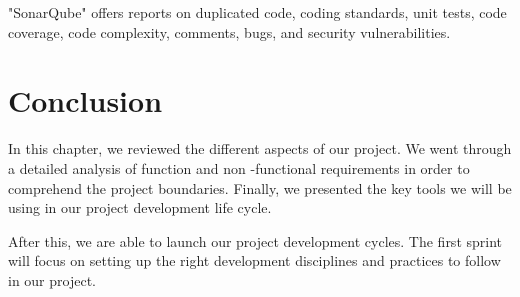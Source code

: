 \begin{spacing}{1.2}
"SonarQube" offers reports on duplicated code, coding standards, unit tests, code coverage, code complexity, comments, bugs, and security vulnerabilities.
\section*{Conclusion}
In this chapter, we reviewed the different aspects of our project. We went through a detailed analysis of function and non -functional requirements in order to comprehend the project boundaries.
Finally, we presented the key tools we will be using in our project development life cycle.

After this, we are able to launch our project development cycles. The first sprint will focus on setting up the right development disciplines and practices to follow in our project.

\end{spacing}
